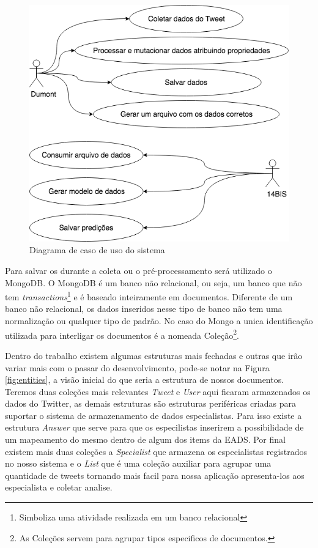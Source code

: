\begin{figure}[!h]
    \centering
    \includegraphics[width=.5\textwidth]{imagens/tcc_caso_de_uso.png}
    \caption{Diagrama de caso de uso do sistema}
    \label{fig:tcc_caso_de_uso}
\end{figure}

Para salvar os durante a coleta ou o pré-processamento será utilizado o MongoDB. O MongoDB  é um banco não relacional, ou seja, um banco que não tem \textit{transactions}\footnote{Simboliza uma atividade realizada em um banco relacional} e é baseado inteiramente em documentos. Diferente de um banco não relacional, os dados inseridos nesse tipo de banco não tem uma normalização ou qualquer tipo de padrão. No caso do Mongo a unica identificação utilizada para interligar os documentos é a nomeada Coleção\footnote{As Coleções servem para agrupar tipos especificos de documentos.}.

Dentro do trabalho existem algumas estruturas mais fechadas e outras que irão variar mais com o passar do desenvolvimento, pode-se notar na Figura \ref{fig:entities}, a visão inicial do que seria a estrutura de nossos documentos. Teremos duas coleções mais relevantes \textit{Tweet} e \textit{User} aqui ficaram armazenados os dados do Twitter, as demais estruturas são estruturas periféricas criadas para suportar o sistema de armazenamento de dados especialistas. Para isso existe a estrutura \textit{Answer} que serve para que os especilistas inserirem a possibilidade de um mapeamento do mesmo dentro de algum dos items da EADS. Por final existem mais duas coleções a \textit{Specialist} que armazena os especialistas registrados no nosso sistema e o \textit{List} que é uma coleção auxiliar para agrupar uma quantidade de tweets tornando mais facil para nossa aplicação apresenta-los aos especialista e coletar analise.

